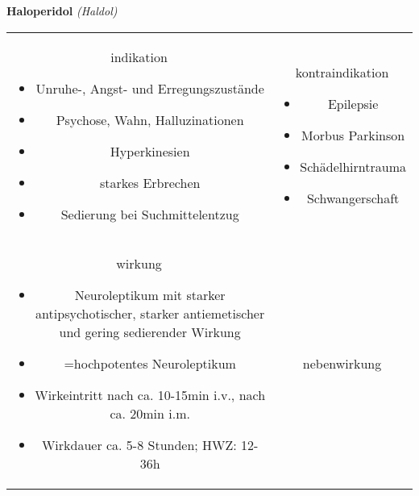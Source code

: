 \begin{frame}{
    \textbf{Haloperidol}
    \textit{(Haldol)}
}
    \begin{tabular}{c c}
        \begin{beamercolorbox}[wd=\boxwidth\textwidth,ht=\boxheight\textheight,sep=1em]{indikation}
            \begin{itemize}
                \item Unruhe-, Angst- und Erregungszustände
                \item Psychose, Wahn, Halluzinationen
                \item Hyperkinesien
                \item starkes Erbrechen
                \item Sedierung bei Suchmittelentzug
            \end{itemize}
        \end{beamercolorbox} & 
        \begin{beamercolorbox}[wd=\boxwidth\textwidth,ht=\boxheight\textheight,sep=1em]{kontraindikation}
            \begin{itemize}
                \item Epilepsie
                \item Morbus Parkinson
                \item Schädelhirntrauma
                \item Schwangerschaft
            \end{itemize}
        \end{beamercolorbox} \\
        \begin{beamercolorbox}[wd=\boxwidth\textwidth,ht=\boxheight\textheight,sep=1em]{wirkung}
            \begin{itemize}
                \item Neuroleptikum mit starker antipsychotischer, starker antiemetischer und gering sedierender Wirkung
                \item =hochpotentes Neuroleptikum
                \item Wirkeintritt nach ca. 10-15min i.v., nach ca. 20min i.m.
                \item Wirkdauer ca. 5-8 Stunden; HWZ: 12-36h
            \end{itemize}
        \end{beamercolorbox} & 
        \begin{beamercolorbox}[wd=\boxwidth\textwidth,ht=\boxheight\textheight,sep=1em]{nebenwirkung}

\end{beamercolorbox}
\end{tabular}
\end{frame}
